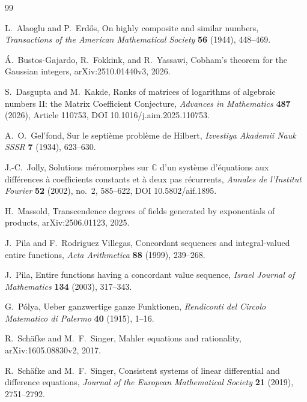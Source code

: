 \documentclass[11pt,oneside]{article}
\theoremstyle{definition}
\theoremstyle{remark}
\newcommand{\C}{\mathbb C}
\begin{document}
\begin{thebibliography}{99}

L.~Alaoglu and P.~Erd\H{o}s,
\newblock On highly composite and similar numbers,
\newblock \emph{Transactions of the American Mathematical Society} \textbf{56} (1944), 448--469.

\'A.~Bustos-Gajardo, R.~Fokkink, and R.~Yassawi,
\newblock Cobham's theorem for the Gaussian integers,
\newblock arXiv:2510.01440v3, 2026.

S.~Dasgupta and M.~Kakde,
\newblock Ranks of matrices of logarithms of algebraic numbers II: the Matrix Coefficient Conjecture,
\newblock \emph{Advances in Mathematics} \textbf{487} (2026), Article 110753,
DOI 10.1016/j.aim.2025.110753.

A.~O.~Gel'fond,
\newblock Sur le septi\`eme probl\`eme de Hilbert,
\newblock \emph{Izvestiya Akademii Nauk SSSR} \textbf{7} (1934), 623--630.

J.-C.~Jolly,
\newblock Solutions m\'eromorphes sur \(\C\) d'un syst\`eme d'\'equations aux diff\'erences \`a coefficients constants et \`a deux pas r\'ecurrents,
\newblock \emph{Annales de l'Institut Fourier} \textbf{52} (2002), no.~2, 585--622,
DOI 10.5802/aif.1895.

H.~Massold,
\newblock Transcendence degrees of fields generated by exponentials of products,
\newblock arXiv:2506.01123, 2025.

J.~Pila and F.~Rodriguez Villegas,
\newblock Concordant sequences and integral-valued entire functions,
\newblock \emph{Acta Arithmetica} \textbf{88} (1999), 239--268.

J.~Pila,
\newblock Entire functions having a concordant value sequence,
\newblock \emph{Israel Journal of Mathematics} \textbf{134} (2003), 317--343.

G.~P\'olya,
\newblock Ueber ganzwertige ganze Funktionen,
\newblock \emph{Rendiconti del Circolo Matematico di Palermo} \textbf{40} (1915), 1--16.

R.~Sch\"afke and M.~F.~Singer,
\newblock Mahler equations and rationality,
\newblock arXiv:1605.08830v2, 2017.

R.~Sch\"afke and M.~F.~Singer,
\newblock Consistent systems of linear differential and difference equations,
\newblock \emph{Journal of the European Mathematical Society} \textbf{21} (2019), 2751--2792.


\end{thebibliography}
\end{document}
